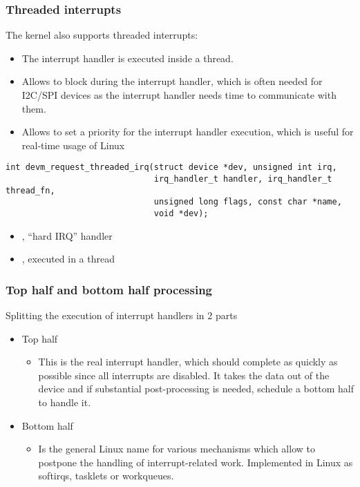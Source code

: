 \begin{frame}[fragile]
  \frametitle{Threaded interrupts}
  The kernel also supports threaded interrupts:
  \begin{itemize}
  \item The interrupt handler is executed inside a thread.
  \item Allows to block during the interrupt handler, which is often
        needed for I2C/SPI devices as the interrupt handler needs time
        to communicate with them.
  \item Allows to set a priority for the interrupt handler
        execution, which is useful for real-time usage of Linux
  \end{itemize}
  \begin{verbatim}
int devm_request_threaded_irq(struct device *dev, unsigned int irq,
                              irq_handler_t handler, irq_handler_t thread_fn,
                              unsigned long flags, const char *name,
                              void *dev);
  \end{verbatim}
  \begin{itemize}
  \item {}, ``hard IRQ'' handler
  \item {}, executed in a thread
  \end{itemize}
\end{frame}

\begin{frame}
  \frametitle{Top half and bottom half processing}
  Splitting the execution of interrupt handlers in 2 parts
  \begin{itemize}
  \item Top half
    \begin{itemize}
    \item This is the real interrupt handler, which should complete
      as quickly as possible since all interrupts are disabled.
      It takes the data out of the device and if substantial
      post-processing is needed, schedule a bottom half to handle it.
    \end{itemize}
  \item Bottom half
    \begin{itemize}
    \item Is the general Linux name for various mechanisms which
      allow to postpone the handling of interrupt-related
      work. Implemented in Linux as softirqs, tasklets or
      workqueues.
    \end{itemize}
  \end{itemize}
\end{frame}

